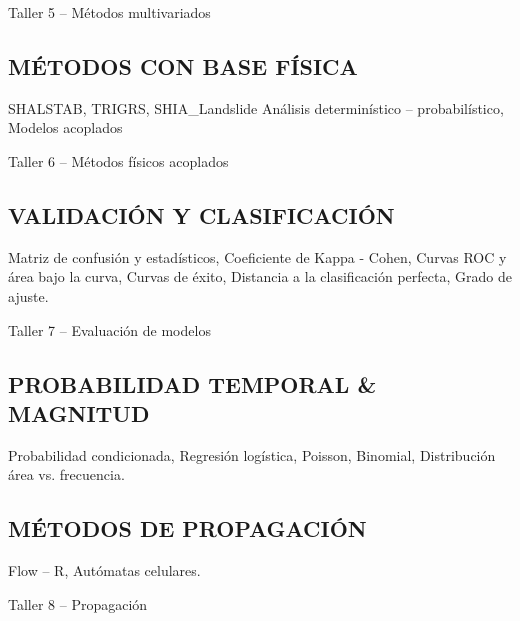\documentclass[twoside,11pt,]{article}
\begin{document}
\begin{tcolorbox}[enhanced,width=5in,center upper,  fontupper=\large\bfseries,drop shadow southwest,sharp corners]
Taller 5 -- Métodos multivariados
\end{tcolorbox}

\subsection {MÉTODOS CON BASE FÍSICA}
SHALSTAB, TRIGRS, SHIA\_Landslide
Análisis determinístico -- probabilístico, Modelos acoplados
\begin{tcolorbox}[enhanced,width=5in,center upper,  fontupper=\large\bfseries,drop shadow southwest,sharp corners]
Taller 6 -- Métodos físicos acoplados
\end{tcolorbox}

\subsection {VALIDACIÓN Y CLASIFICACIÓN}
Matriz de confusión y estadísticos, Coeficiente de Kappa - Cohen, Curvas ROC y área bajo la curva, Curvas de éxito, Distancia a la clasificación perfecta, Grado de ajuste.

\begin{tcolorbox}[enhanced,width=5in,center upper,  fontupper=\large\bfseries,drop shadow southwest,sharp corners]
Taller 7 -- Evaluación de modelos
\end{tcolorbox}

\subsection {PROBABILIDAD TEMPORAL \& MAGNITUD}
Probabilidad condicionada, Regresión logística, Poisson, Binomial, Distribución área vs. frecuencia.


\subsection {MÉTODOS DE PROPAGACIÓN}
Flow – R, Autómatas celulares.

\begin{tcolorbox}[enhanced,width=5in,center upper,  fontupper=\large\bfseries,drop shadow southwest,sharp corners]
Taller 8 -- Propagación 
\end{tcolorbox}
\end{document}
